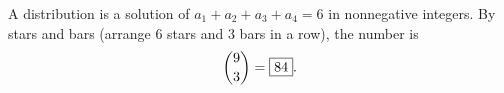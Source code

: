 A distribution is a solution of $a_1+a_2+a_3+a_4=6$ in nonnegative integers. By stars and bars (arrange $6$ stars and $3$ bars in a row), the number is
\[\dbinom{9}{3}=\boxed{84}.\]
